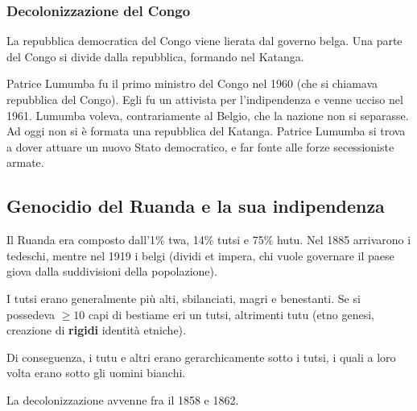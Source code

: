 \documentclass[a4paper]{article}
\begin{document}
\subsubsection{Decolonizzazione del Congo}

La repubblica democratica del Congo viene lierata dal governo belga.
Una parte del Congo si divide dalla repubblica, formando nel Katanga.


Patrice Lumumba fu il primo ministro del Congo nel 1960 (che si chiamava repubblica del Congo).
Egli fu un attivista per l'indipendenza e venne ucciso nel 1961.
Lumumba voleva, contrariamente al Belgio, che la nazione non si separasse.
Ad oggi non si è formata una repubblica del Katanga.
Patrice Lumumba si trova a dover attuare un nuovo Stato democratico,
e far fonte alle forze secessioniste armate.



\pagebreak

\subsection{Genocidio del Ruanda e la sua indipendenza}

Il Ruanda era composto dall'1\% twa, 14\% tutsi e 75\% hutu.
Nel 1885 arrivarono i tedeschi, mentre nel 1919 i belgi (dividi et impera, chi vuole governare
il paese giova dalla suddivisioni della popolazione).

I tutsi erano generalmente più alti, sbilanciati, magri e benestanti.
Se si possedeva \(\geq 10\) capi di bestiame eri un tutsi, altrimenti tutu (etno genesi,
creazione di \textbf{rigidi} identità etniche).

Di conseguenza, i tutu e altri erano gerarchicamente sotto i tutsi, i quali a loro volta
erano sotto gli uomini bianchi.

La decolonizzazione avvenne fra il 1858 e 1862.


\end{document}
